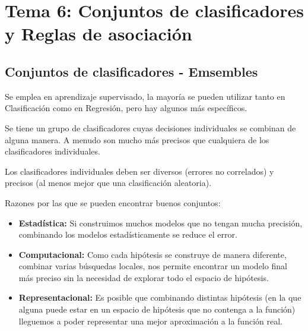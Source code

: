 \documentclass[12pt, twoside, openright]{report} %
\begin{document}
\chapter{Tema 6: Conjuntos de clasificadores y Reglas de asociación}
\section{Conjuntos de clasificadores - Emsembles}
Se emplea en aprendizaje supervisado, la mayoría se pueden utilizar tanto en Clasificación como en Regresión, pero hay algunos más específicos.

Se tiene un grupo de clasificadores cuyas decisiones individuales se combinan de alguna manera. A menudo son mucho más precisos que cualquiera de los clasificadores individuales.

Los clasificadores individuales deben ser diversos (errores no correlados) y precisos (al menos mejor que una clasificación aleatoria).

Razones por las que se pueden encontrar buenos conjuntos:
\begin{itemize}
  \item \textbf{Estadística:} Si construimos muchos modelos que no tengan mucha precisión, combinando los modelos estadísticamente se reduce el error.
  \item \textbf{Computacional:} Como cada hipótesis se construye de manera diferente, combinar varias búsquedas locales, nos permite encontrar un modelo final más preciso sin la necesidad de explorar todo el espacio de hipótesis.
  \item \textbf{Representacional:} Es posible que combinando distintas hipótesis (en la que alguna puede estar en un espacio de hipótesis que no contenga a la función) lleguemos a poder representar una mejor aproximación a la función real.
\end{itemize}
\end{document}
